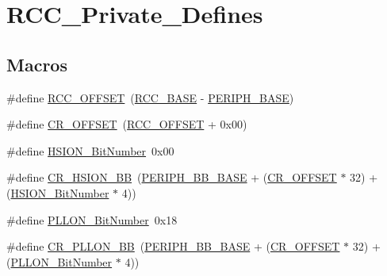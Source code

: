 \hypertarget{group___r_c_c___private___defines}{}\section{R\+C\+C\+\_\+\+Private\+\_\+\+Defines}
\label{group___r_c_c___private___defines}
\subsection*{Macros}
\begin{DoxyCompactItemize}
\item 
\#define \hyperlink{group___r_c_c___private___defines_ga539e07c3b3c55f1f1d47231341fb11e1}{R\+C\+C\+\_\+\+O\+F\+F\+S\+ET}~(\hyperlink{openmotestm_2library_2inc_2stm32f10x__map_8h_a0e681b03f364532055d88f63fec0d99d}{R\+C\+C\+\_\+\+B\+A\+SE} -\/ \hyperlink{openmotestm_2library_2inc_2stm32f10x__map_8h_a9171f49478fa86d932f89e78e73b88b0}{P\+E\+R\+I\+P\+H\+\_\+\+B\+A\+SE})
\item 
\#define \hyperlink{group___r_c_c___private___defines_gafa1d3d0ea72132df651c76fc1bdffffc}{C\+R\+\_\+\+O\+F\+F\+S\+ET}~(\hyperlink{openmotestm_2library_2src_2stm32f10x__rcc_8c_a539e07c3b3c55f1f1d47231341fb11e1}{R\+C\+C\+\_\+\+O\+F\+F\+S\+ET} + 0x00)
\item 
\#define \hyperlink{group___r_c_c___private___defines_ga3d3085e491cbef815d223afbe5bf1930}{H\+S\+I\+O\+N\+\_\+\+Bit\+Number}~0x00
\item 
\#define \hyperlink{group___r_c_c___private___defines_gac3290a833c0e35ec17d32c2d494e6133}{C\+R\+\_\+\+H\+S\+I\+O\+N\+\_\+\+BB}~(\hyperlink{openmotestm_2library_2inc_2stm32f10x__map_8h_aed7efc100877000845c236ccdc9e144a}{P\+E\+R\+I\+P\+H\+\_\+\+B\+B\+\_\+\+B\+A\+SE} + (\hyperlink{openmotestm_2library_2src_2stm32f10x__rcc_8c_afa1d3d0ea72132df651c76fc1bdffffc}{C\+R\+\_\+\+O\+F\+F\+S\+ET} $\ast$ 32) + (\hyperlink{openmotestm_2library_2src_2stm32f10x__rcc_8c_a3d3085e491cbef815d223afbe5bf1930}{H\+S\+I\+O\+N\+\_\+\+Bit\+Number} $\ast$ 4))
\item 
\#define \hyperlink{group___r_c_c___private___defines_gab24d7f5f8e4b3b717fd91b54f393f6a3}{P\+L\+L\+O\+N\+\_\+\+Bit\+Number}~0x18
\item 
\#define \hyperlink{group___r_c_c___private___defines_ga3f1fb2589cb8b5ac2f7121aba1135a5f}{C\+R\+\_\+\+P\+L\+L\+O\+N\+\_\+\+BB}~(\hyperlink{openmotestm_2library_2inc_2stm32f10x__map_8h_aed7efc100877000845c236ccdc9e144a}{P\+E\+R\+I\+P\+H\+\_\+\+B\+B\+\_\+\+B\+A\+SE} + (\hyperlink{openmotestm_2library_2src_2stm32f10x__rcc_8c_afa1d3d0ea72132df651c76fc1bdffffc}{C\+R\+\_\+\+O\+F\+F\+S\+ET} $\ast$ 32) + (\hyperlink{openmotestm_2library_2src_2stm32f10x__rcc_8c_ab24d7f5f8e4b3b717fd91b54f393f6a3}{P\+L\+L\+O\+N\+\_\+\+Bit\+Number} $\ast$ 4))

\end{DoxyCompactItemize}

